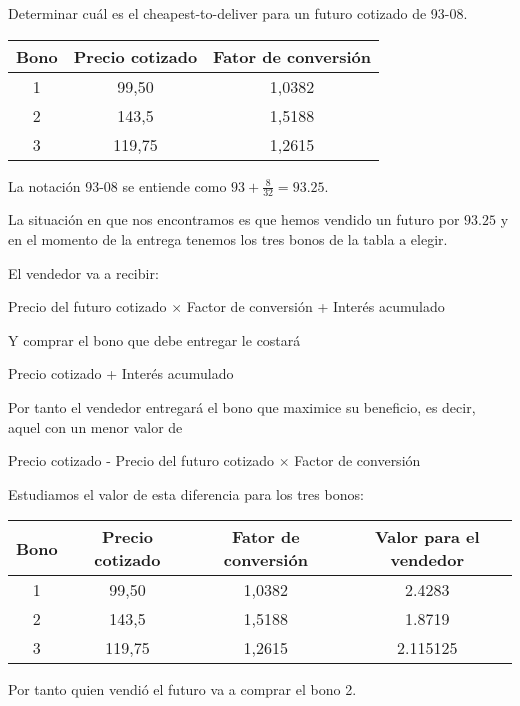 \begin{problem}[2]
Determinar cuál es el cheapest-to-deliver para un futuro cotizado de 93-08.

\begin{center}
\begin{tabular}{|c|c|c|}
\hline
\textbf{Bono} & \textbf{Precio cotizado} & \textbf{Fator de conversión} \\
\hline
1 & 99,50 & 1,0382 \\
2 & 143,5 & 1,5188 \\
3 & 119,75 & 1,2615\\
\hline
\end{tabular}
\end{center}

\solution
{}

La notación 93-08 se entiende como $93 + \frac{8}{32} = 93.25$.

La situación en que nos encontramos es que hemos vendido un futuro por $93.25$ y en el momento de la entrega tenemos
los tres bonos de la tabla a elegir.

El vendedor va a recibir:
\begin{center}
Precio del futuro cotizado $\times$ Factor de conversión + Interés acumulado
\end{center}
Y comprar el bono que debe entregar le costará
\begin{center}
Precio cotizado + Interés acumulado
\end{center}

Por tanto el vendedor entregará el bono que maximice su beneficio, es decir, aquel con un menor valor de
\begin{center}
Precio cotizado - Precio del futuro cotizado $\times$ Factor de conversión
\end{center}

Estudiamos el valor de esta diferencia para los tres bonos:

\begin{center}
\begin{tabular}{|c|c|c|c|}
\hline
\textbf{Bono} & \textbf{Precio cotizado} & \textbf{Fator de conversión} & \textbf{Valor para el vendedor} \\
\hline
1 & 99,50 & 1,0382 & 2.4283 \\
2 & 143,5 & 1,5188 & 1.8719 \\
3 & 119,75 & 1,2615 & 2.115125\\
\hline
\end{tabular}
\end{center}

Por tanto quien vendió el futuro va a comprar el bono 2.
\end{problem}

